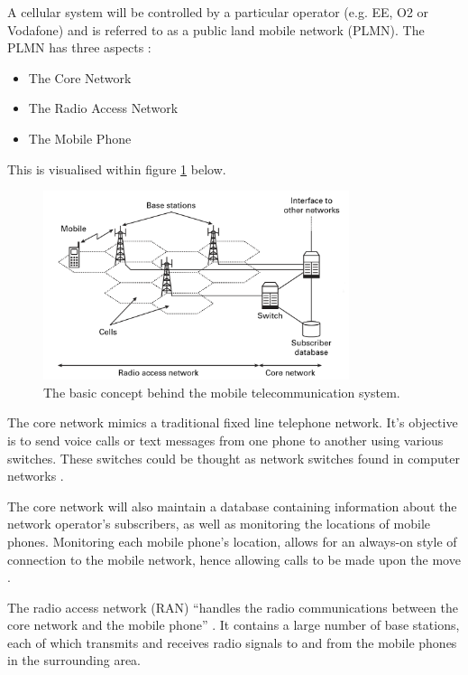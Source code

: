 A cellular system will be controlled by a particular operator (e.g. EE, O2 or 
Vodafone) and is referred to as a public land mobile network (PLMN). The PLMN 
has three aspects \citep{cox08}:
\begin{itemize}
  \item The Core Network
  \item The Radio Access Network
  \item The Mobile Phone
\end{itemize}

This is visualised within figure \ref{fig:mobileSystem} below.

\begin{figure}[H]
  \centering
    \includegraphics[width=0.8\textwidth]{chapter3/mobile_networks/mobile_architecture.png}
  \caption{The basic concept behind the mobile telecommunication system.}
    \label{fig:mobileSystem}
\end{figure}

The core network mimics a traditional fixed line telephone network. It's 
objective is to send voice calls or text messages from one phone to another 
using various switches. These switches could be thought as network switches 
found in computer networks \citep{cox08}.

The core network will also maintain a database containing information about the
network operator’s subscribers, as well as monitoring the locations of mobile 
phones. Monitoring each mobile phone's location, allows for an always-on style 
of connection to the mobile network, hence allowing calls to be made upon the
move \citep{cox08}.

The radio access network (RAN) ``handles the radio communications between the 
core network and the mobile phone'' \citep{cox08}. It contains a large number 
of base stations, each of which transmits and receives radio signals to and 
from the mobile phones in the surrounding area.

